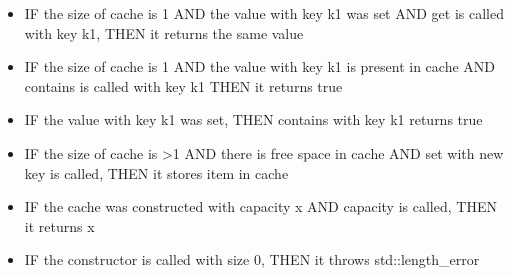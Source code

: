 \begin{itemize}
	\item IF the size of cache is 1 AND the value with key k1 was set AND get is called with key k1, THEN it returns the same value
	\item IF the size of cache is 1 AND the value with key k1 is present in cache AND contains is called with key k1 THEN it returns true
	\item IF the value with key k1 was set, THEN contains with key k1 returns true
	\item IF the size of cache is >1 AND there is free space in cache AND set with new key is called, THEN it stores item in cache
	\item IF the cache was constructed with capacity x AND capacity is called, THEN it returns x
	\item IF the constructor is called with size 0, THEN it throws std::length\_error
\end{itemize}

